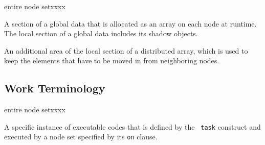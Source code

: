 \begin{namelist}{entire node setxxxx}

 A section of a global data that is allocated as an array on each node
 at runtime.
%
 The local section of a global data includes its shadow objects.


 An additional area of the local section of a distributed array, which
 is used to keep the elements that have to be moved in from neighboring
 nodes.


\end{namelist}


\subsection{Work Terminology}

\begin{namelist}{entire node setxxxx}


 A specific instance of executable codes that is defined by the {\tt
 task} construct and executed by a node set specified by its {\tt on}
 clause.


%

%


\end{namelist}



